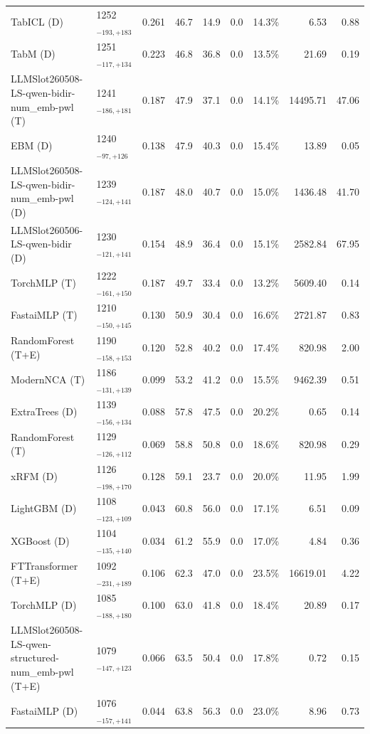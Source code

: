 \begin{tabular}{llcccccrr}
TabICL (D) & 1252${}_{-193,+183}$ & 0.261 & 46.7 & 14.9 & 0.0 & 14.3\% & 6.53 & 0.88 \\
TabM (D) & 1251${}_{-117,+134}$ & 0.223 & 46.8 & 36.8 & 0.0 & 13.5\% & 21.69 & 0.19 \\
LLMSlot260508-LS-qwen-bidir-num_emb-pwl (T) & 1241${}_{-186,+181}$ & 0.187 & 47.9 & 37.1 & 0.0 & 14.1\% & 14495.71 & 47.06 \\
EBM (D) & 1240${}_{-97,+126}$ & 0.138 & 47.9 & 40.3 & 0.0 & 15.4\% & 13.89 & 0.05 \\
LLMSlot260508-LS-qwen-bidir-num_emb-pwl (D) & 1239${}_{-124,+141}$ & 0.187 & 48.0 & 40.7 & 0.0 & 15.0\% & 1436.48 & 41.70 \\
LLMSlot260506-LS-qwen-bidir (D) & 1230${}_{-121,+141}$ & 0.154 & 48.9 & 36.4 & 0.0 & 15.1\% & 2582.84 & 67.95 \\
TorchMLP (T) & 1222${}_{-161,+150}$ & 0.187 & 49.7 & 33.4 & 0.0 & 13.2\% & 5609.40 & 0.14 \\
FastaiMLP (T) & 1210${}_{-150,+145}$ & 0.130 & 50.9 & 30.4 & 0.0 & 16.6\% & 2721.87 & 0.83 \\
RandomForest (T+E) & 1190${}_{-158,+153}$ & 0.120 & 52.8 & 40.2 & 0.0 & 17.4\% & 820.98 & 2.00 \\
ModernNCA (T) & 1186${}_{-131,+139}$ & 0.099 & 53.2 & 41.2 & 0.0 & 15.5\% & 9462.39 & 0.51 \\
ExtraTrees (D) & 1139${}_{-156,+134}$ & 0.088 & 57.8 & 47.5 & 0.0 & 20.2\% & 0.65 & 0.14 \\
RandomForest (T) & 1129${}_{-126,+112}$ & 0.069 & 58.8 & 50.8 & 0.0 & 18.6\% & 820.98 & 0.29 \\
xRFM (D) & 1126${}_{-198,+170}$ & 0.128 & 59.1 & 23.7 & 0.0 & 20.0\% & 11.95 & 1.99 \\
LightGBM (D) & 1108${}_{-123,+109}$ & 0.043 & 60.8 & 56.0 & 0.0 & 17.1\% & 6.51 & 0.09 \\
XGBoost (D) & 1104${}_{-135,+140}$ & 0.034 & 61.2 & 55.9 & 0.0 & 17.0\% & 4.84 & 0.36 \\
FTTransformer (T+E) & 1092${}_{-231,+189}$ & 0.106 & 62.3 & 47.0 & 0.0 & 23.5\% & 16619.01 & 4.22 \\
TorchMLP (D) & 1085${}_{-188,+180}$ & 0.100 & 63.0 & 41.8 & 0.0 & 18.4\% & 20.89 & 0.17 \\
LLMSlot260508-LS-qwen-structured-num_emb-pwl (T+E) & 1079${}_{-147,+123}$ & 0.066 & 63.5 & 50.4 & 0.0 & 17.8\% & 0.72 & 0.15 \\
FastaiMLP (D) & 1076${}_{-157,+141}$ & 0.044 & 63.8 & 56.3 & 0.0 & 23.0\% & 8.96 & 0.73 \\

\end{tabular}
